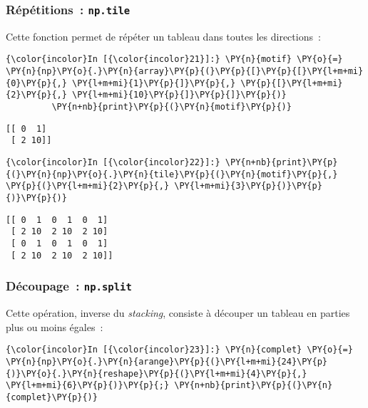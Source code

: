     \hypertarget{ruxe9puxe9titions-np.tile}{%
\subsubsection{\texorpdfstring{Répétitions~:
\texttt{np.tile}}{Répétitions~: np.tile}}\label{ruxe9puxe9titions-np.tile}}

    Cette fonction permet de répéter un tableau dans toutes les directions~:

    \begin{Verbatim}[commandchars=\\\{\}]
{\color{incolor}In [{\color{incolor}21}]:} \PY{n}{motif} \PY{o}{=} \PY{n}{np}\PY{o}{.}\PY{n}{array}\PY{p}{(}\PY{p}{[}\PY{p}{[}\PY{l+m+mi}{0}\PY{p}{,} \PY{l+m+mi}{1}\PY{p}{]}\PY{p}{,} \PY{p}{[}\PY{l+m+mi}{2}\PY{p}{,} \PY{l+m+mi}{10}\PY{p}{]}\PY{p}{]}\PY{p}{)}
         \PY{n+nb}{print}\PY{p}{(}\PY{n}{motif}\PY{p}{)}
\end{Verbatim}


    \begin{Verbatim}[commandchars=\\\{\}]
[[ 0  1]
 [ 2 10]]

    \end{Verbatim}

    \begin{Verbatim}[commandchars=\\\{\}]
{\color{incolor}In [{\color{incolor}22}]:} \PY{n+nb}{print}\PY{p}{(}\PY{n}{np}\PY{o}{.}\PY{n}{tile}\PY{p}{(}\PY{n}{motif}\PY{p}{,} \PY{p}{(}\PY{l+m+mi}{2}\PY{p}{,} \PY{l+m+mi}{3}\PY{p}{)}\PY{p}{)}\PY{p}{)}
\end{Verbatim}


    \begin{Verbatim}[commandchars=\\\{\}]
[[ 0  1  0  1  0  1]
 [ 2 10  2 10  2 10]
 [ 0  1  0  1  0  1]
 [ 2 10  2 10  2 10]]

    \end{Verbatim}

    \hypertarget{duxe9coupage-np.split}{%
\subsubsection{\texorpdfstring{Découpage~:
\texttt{np.split}}{Découpage~: np.split}}\label{duxe9coupage-np.split}}

    Cette opération, inverse du \emph{stacking}, consiste à découper un
tableau en parties plus ou moins égales~:

    \begin{Verbatim}[commandchars=\\\{\}]
{\color{incolor}In [{\color{incolor}23}]:} \PY{n}{complet} \PY{o}{=} \PY{n}{np}\PY{o}{.}\PY{n}{arange}\PY{p}{(}\PY{l+m+mi}{24}\PY{p}{)}\PY{o}{.}\PY{n}{reshape}\PY{p}{(}\PY{l+m+mi}{4}\PY{p}{,} \PY{l+m+mi}{6}\PY{p}{)}\PY{p}{;} \PY{n+nb}{print}\PY{p}{(}\PY{n}{complet}\PY{p}{)}
\end{Verbatim}


